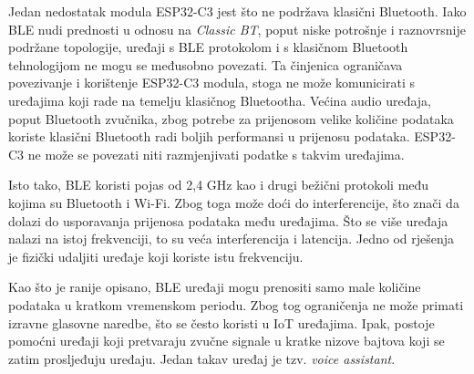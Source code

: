Jedan nedostatak modula ESP32-C3 jest što ne podržava klasični Bluetooth. Iako BLE nudi prednosti u odnosu na \textit{Classic BT}, poput niske potrošnje i raznovrsnije podržane topologije, uređaji s BLE protokolom i s klasičnom Bluetooth tehnologijom ne mogu se međusobno povezati. Ta činjenica ograničava povezivanje i korištenje ESP32-C3 modula, stoga ne može komunicirati s uređajima koji rade na temelju klasičnog Bluetootha. Većina audio uređaja, poput Bluetooth zvučnika, zbog potrebe za prijenosom velike količine podataka koriste klasični Bluetooth radi boljih performansi u prijenosu podataka. ESP32-C3 ne može se povezati niti razmjenjivati podatke s takvim uređajima.

Isto tako, BLE koristi pojas od 2,4 GHz kao i drugi bežični protokoli među kojima su Bluetooth i Wi-Fi. Zbog toga može doći do interferencije, što znači da dolazi do usporavanja prijenosa podataka među uređajima. Što se više uređaja nalazi na istoj frekvenciji, to su veća interferencija i latencija. Jedno od rješenja je fizički udaljiti uređaje koji koriste istu frekvenciju. \cite{limit_bt}

Kao što je ranije opisano, BLE uređaji mogu prenositi samo male količine podataka u kratkom vremenskom periodu.  Zbog tog ograničenja ne može primati izravne glasovne naredbe, što se često koristi u IoT uređajima. Ipak, postoje pomoćni uređaji koji pretvaraju zvučne signale u kratke nizove bajtova koji se zatim prosljeđuju uređaju. Jedan takav uređaj je tzv. \textit{voice assistant}.


\eject